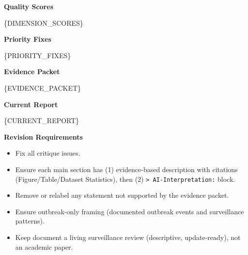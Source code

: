 \begin{tcolorbox}
\begin{tcolorbox}[
    enhanced,
    colback=gray!5,
    colframe=gray!20,
    boxrule=0pt,
    leftrule=3pt,
    arc=0pt,
    left=6pt, right=6pt, top=4pt, bottom=4pt
]
{\small\textbf{\textcolor{gray!60!black}{Quality Scores}}}

\vspace{2pt}
{\small\ttfamily
\{DIMENSION\_SCORES\}
}
\end{tcolorbox}

\begin{tcolorbox}[
    enhanced,
    colback=gray!5,
    colframe=gray!20,
    boxrule=0pt,
    leftrule=3pt,
    arc=0pt,
    left=6pt, right=6pt, top=4pt, bottom=4pt
]
{\small\textbf{\textcolor{gray!70!black}{Priority Fixes}}}

\vspace{2pt}
{\small\ttfamily
\{PRIORITY\_FIXES\}
}
\end{tcolorbox}

\begin{tcolorbox}[
    enhanced,
    colback=gray!5,
    colframe=gray!20,
    boxrule=0pt,
    leftrule=3pt,
    arc=0pt,
    left=6pt, right=6pt, top=4pt, bottom=4pt
]
{\small\textbf{\textcolor{gray!70!black}{Evidence Packet}}}

\vspace{2pt}
{\small\ttfamily
\{EVIDENCE\_PACKET\}
}
\end{tcolorbox}

\begin{tcolorbox}[
    enhanced,
    colback=gray!5,
    colframe=gray!20,
    boxrule=0pt,
    leftrule=3pt,
    arc=0pt,
    left=6pt, right=6pt, top=4pt, bottom=4pt
]
{\small\textbf{\textcolor{gray!70!black}{Current Report}}}

\vspace{2pt}
{\small\ttfamily
\{CURRENT\_REPORT\}
}
\end{tcolorbox}

\begin{tcolorbox}[
    enhanced,
    colback=gray!5,
    colframe=gray!20,
    boxrule=0pt,
    leftrule=3pt,
    arc=0pt,
    left=6pt, right=6pt, top=4pt, bottom=4pt
]
{\small\textbf{\textcolor{gray!60!black}{Revision Requirements}}}

\vspace{2pt}
{\small
\begin{itemize}[leftmargin=*, itemsep=-3pt]
    \item Fix all critique issues.
    \item Ensure each main section has (1) evidence-based description with citations (Figure/Table/Dataset Statistics), then (2) \texttt{> AI-Interpretation:} block.
    \item Remove or relabel any statement not supported by the evidence packet.
    \item Ensure outbreak-only framing (documented outbreak events and surveillance patterns).
    \item Keep document a living surveillance review (descriptive, update-ready), not an academic paper.
\end{itemize}

}
\end{tcolorbox}
\end{tcolorbox}
